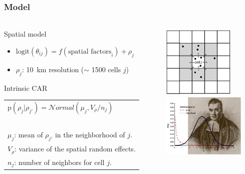 \documentclass[slidetop,10pt,dvipsnames,leqno,fleqn]{beamer} %
\newcommand{\logit}{\text{logit}}
\newcommand{\p}{\text{p}}
\begin{document}
\begin{frame}
  \frametitle{Model}
  \framesubtitle{}
  \begin{columns}
    \begin{column}{0.6\textwidth}
      \begin{block}{Spatial model}
        \begin{itemize}
        \item $\logit(\theta_{ij})=f(\text{spatial factors}_i)+\rho_j$
        \item $\rho_j$: 10~km resolution ($\sim$ 1500 cells $j$)
        \end{itemize}
      \end{block}
      \begin{block}{Intrinsic CAR}
        \begin{tabular}{l}
          $\p(\rho_j|\rho_{j'}) = \mathcal{N}ormal(\mu_j,V_{\rho} / n_j)$ \\
          ~\\
          $\mu_j$: mean of $\rho_{j'}$ in the neighborhood of $j$. \\
          $V_{\rho}$: variance of the spatial random effects. \\
          $n_j$: number of neighbors for cell $j$. \\
        \end{tabular}
      \end{block}
    \end{column}
    \begin{column}{0.4\textwidth}
      \centering \includegraphics[width=3.5cm]{./Figures/iCAR.png} \\
      \centering \includegraphics[width=4cm]{./Figures/Bayes.jpg}
    \end{column}
  \end{columns}
\end{frame}
\end{document}
